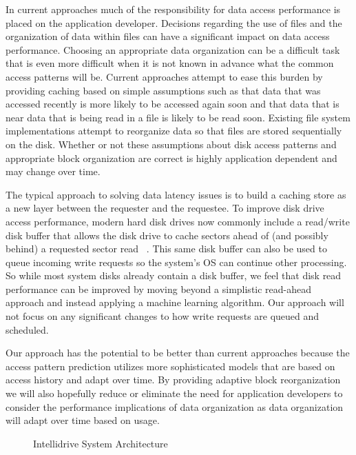 \documentclass[letterpaper,twocolumn,10pt]{article}
\begin{document}
In current approaches much of the responsibility for data access performance is placed on the application developer.  Decisions regarding the use of files and the organization of data within files can have a significant impact on data access performance.  Choosing an appropriate data organization can be a difficult task that is even more difficult when it is not known in advance what the common access patterns will be.  Current approaches attempt to ease this burden by providing caching based on simple assumptions such as that data that was accessed recently is more likely to be accessed again soon and that data that is near data that is being read in a file is likely to be read soon.  Existing file system implementations attempt to reorganize data so that files are stored sequentially on the disk.  Whether or not these assumptions about disk access patterns and appropriate block organization are correct is highly application dependent and may change over time.

The typical approach to solving data latency issues is to build a caching store as a new layer between the requester and the requestee.  To improve disk drive access performance, modern hard disk drives now commonly include a read/write disk buffer that allows the disk drive to cache sectors ahead of (and possibly behind) a requested sector read ~\cite{MultiplePrefetch}.  This same disk buffer can also be used to queue incoming write requests so the system's OS can continue other processing.  So while most system disks already contain a disk buffer, we feel that disk read performance can be improved by moving beyond a simplistic read-ahead approach and instead applying a machine learning algorithm.  Our approach will not focus on any significant changes to how write requests are queued and scheduled.

Our approach has the potential to be better than current approaches because the access pattern prediction utilizes more sophisticated models that are based on access history and adapt over time.  By providing adaptive block reorganization we will also hopefully reduce or eliminate the need for application developers to consider the performance implications of data organization as data organization will adapt over time based on usage.

\begin{figure}[ht]
  \caption{Intellidrive System Architecture}
\end{figure}
\end{document}
